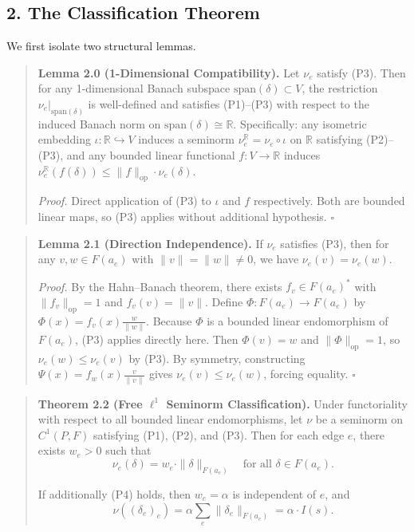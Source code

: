 \documentclass[
]{article}
\begin{document}
\subsection{2. The Classification
Theorem}\label{the-classification-theorem}

We first isolate two structural lemmas.

\begin{quote}
\textbf{Lemma 2.0 (1-Dimensional Compatibility).} Let \(\nu_e\) satisfy
(P3). Then for any 1-dimensional Banach subspace
\(\text{span}(\delta) \subset V\), the restriction
\(\nu_e|_{\text{span}(\delta)}\) is well-defined and satisfies
(P1)--(P3) with respect to the induced Banach norm on
\(\text{span}(\delta) \cong \mathbb{R}\). Specifically: any isometric
embedding \(\iota: \mathbb{R} \hookrightarrow V\) induces a seminorm
\(\nu_e^{\mathbb{R}} = \nu_e \circ \iota\) on \(\mathbb{R}\) satisfying
(P2)--(P3), and any bounded linear functional \(f: V \to \mathbb{R}\)
induces
\(\nu_e^{\mathbb{R}}(f(\delta)) \leq \|f\|_{\text{op}} \cdot \nu_e(\delta)\).

\emph{Proof.} Direct application of (P3) to \(\iota\) and \(f\)
respectively. Both are bounded linear maps, so (P3) applies without
additional hypothesis. \(\square\)
\end{quote}

\begin{quote}
\textbf{Lemma 2.1 (Direction Independence).} If \(\nu_e\) satisfies
(P3), then for any \(v, w \in F(a_e)\) with \(\|v\| = \|w\| \neq 0\), we
have \(\nu_e(v) = \nu_e(w)\).

\emph{Proof.} By the Hahn--Banach theorem, there exists
\(f_v \in F(a_e)^*\) with \(\|f_v\|_{\text{op}} = 1\) and
\(f_v(v) = \|v\|\). Define \(\Phi: F(a_e) \to F(a_e)\) by
\(\Phi(x) = f_v(x) \frac{w}{\|w\|}\). Because \(\Phi\) is a bounded
linear endomorphism of \(F(a_e)\), (P3) applies directly here. Then
\(\Phi(v) = w\) and \(\|\Phi\|_{\text{op}} = 1\), so
\(\nu_e(w) \leq \nu_e(v)\) by (P3). By symmetry, constructing
\(\Psi(x) = f_w(x) \frac{v}{\|v\|}\) gives \(\nu_e(v) \leq \nu_e(w)\),
forcing equality. \(\square\)
\end{quote}

\begin{quote}
\textbf{Theorem 2.2 (Free \(\ell^1\) Seminorm Classification).} Under
functoriality with respect to all bounded linear endomorphisms, let
\(\nu\) be a seminorm on \(C^1(P, F)\) satisfying (P1), (P2), and (P3).
Then for each edge \(e\), there exists \(w_e > 0\) such that
\[\nu_e(\delta) = w_e \cdot \|\delta\|_{F(a_e)} \quad \text{for all } \delta \in F(a_e).\]

If additionally (P4) holds, then \(w_e = \alpha\) is independent of
\(e\), and
\[\nu((\delta_e)_e) = \alpha \sum_{e} \|\delta_e\|_{F(a_e)} = \alpha \cdot I(s).\]
\end{quote}
\end{document}

